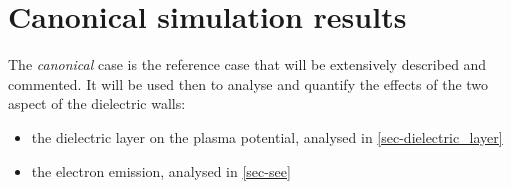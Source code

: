 
\section{Canonical simulation results}
  \label{sec-canonical}
  
  The {\it canonical} case is the reference case that will be extensively described and commented.
  It will be used then to analyse and quantify the effects of the two aspect of the dielectric walls:
  \begin{itemize}
    \item the dielectric layer on the plasma potential, analysed in \cref{sec-dielectric_layer}
    \item the electron emission, analysed in \cref{sec-see}
  \end{itemize}
  